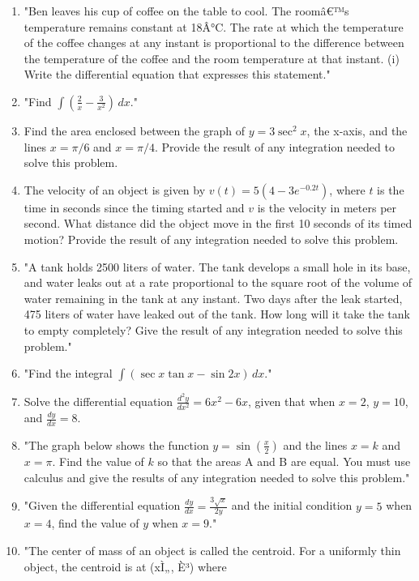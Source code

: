 \documentclass{article}
\begin{document}
\begin{enumerate}
\vspace{3cm}
\item "Ben leaves his cup of coffee on the table to cool. The roomâ€™s temperature remains constant at 18Â°C. The rate at which the temperature of the coffee changes at any instant is proportional to the difference between the temperature of the coffee and the room temperature at that instant. (i) Write the differential equation that expresses this statement."
\vspace{3cm}
\item "Find \(\int \left( \frac{2}{x} - \frac{3}{x^2} \right) \, dx\)."
\vspace{3cm}
\item Find the area enclosed between the graph of \(y = 3 \sec^2 x\), the x-axis, and the lines \(x = \pi/6\) and \(x = \pi/4\). Provide the result of any integration needed to solve this problem.
\vspace{3cm}
\item The velocity of an object is given by \(v(t) = 5(4 - 3e^{-0.2t})\), where \(t\) is the time in seconds since the timing started and \(v\) is the velocity in meters per second. What distance did the object move in the first 10 seconds of its timed motion? Provide the result of any integration needed to solve this problem.
\vspace{3cm}
\item "A tank holds 2500 liters of water. The tank develops a small hole in its base, and water leaks out at a rate proportional to the square root of the volume of water remaining in the tank at any instant. Two days after the leak started, 475 liters of water have leaked out of the tank. How long will it take the tank to empty completely? Give the result of any integration needed to solve this problem."
\vspace{3cm}
\item "Find the integral \(\int (\sec x \tan x - \sin 2x) \, dx\)."
\vspace{3cm}
\item Solve the differential equation \(\frac{d^2 y}{dx^2} = 6x^2 - 6x\), given that when \(x = 2\), \(y = 10\), and \(\frac{dy}{dx} = 8\).
\vspace{3cm}
\item "The graph below shows the function \( y = \sin \left( \frac{x}{2} \right) \) and the lines \( x = k \) and \( x = \pi \). Find the value of \( k \) so that the areas A and B are equal. You must use calculus and give the results of any integration needed to solve this problem."
\vspace{3cm}
\item "Given the differential equation \(\frac{dy}{dx} = \frac{3\sqrt{x}}{2y}\) and the initial condition \(y = 5\) when \(x = 4\), find the value of \(y\) when \(x = 9\)."
\vspace{3cm}
\item "The center of mass of an object is called the centroid. For a uniformly thin object, the centroid is at (xÌ„, È³) where


\end{enumerate}
\end{document}
